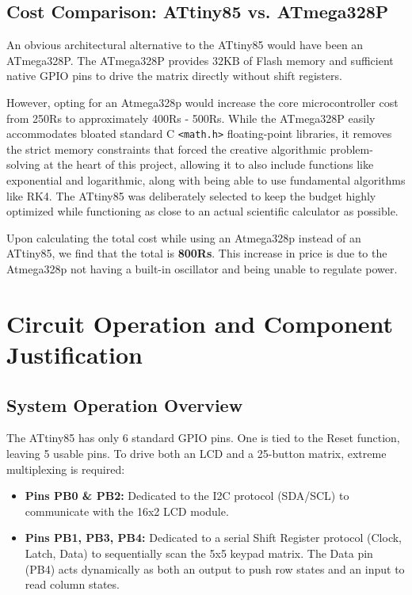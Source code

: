 \documentclass[conference]{IEEEtran}
\begin{document}
\subsection{Cost Comparison: ATtiny85 vs. ATmega328P}
An obvious architectural alternative to the ATtiny85 would have been an ATmega328P. The ATmega328P provides $32\text{KB}$ of Flash memory and sufficient native GPIO pins to drive the matrix directly without shift registers.

However, opting for an Atmega328p would increase the core microcontroller cost from 250Rs to approximately 400Rs - 500Rs. While the ATmega328P easily accommodates bloated standard C \texttt{<math.h>} floating-point libraries, it removes the strict memory constraints that forced the creative algorithmic problem-solving at the heart of this project, allowing it to also include functions like exponential and logarithmic, along with being able to use fundamental algorithms like RK4. The ATtiny85 was deliberately selected to keep the budget highly optimized while functioning as close to an actual scientific calculator as possible.

Upon calculating the total cost while using an Atmega328p instead of an ATtiny85, we find that the total is \textbf{800Rs}. This increase in price is due to the Atmega328p not having a built-in oscillator and being unable to regulate power.

\section{Circuit Operation and Component Justification}

\subsection{System Operation Overview}
The ATtiny85 has only 6 standard GPIO pins. One is tied to the Reset function, leaving 5 usable pins. To drive both an LCD and a 25-button matrix, extreme multiplexing is required:
\begin{itemize}
    \item \textbf{Pins PB0 \& PB2:} Dedicated to the I2C protocol (SDA/SCL) to communicate with the 16x2 LCD module.
    \item \textbf{Pins PB1, PB3, PB4:} Dedicated to a serial Shift Register protocol (Clock, Latch, Data) to sequentially scan the 5x5 keypad matrix. The Data pin (PB4) acts dynamically as both an output to push row states and an input to read column states.
\end{itemize}
\end{document}
